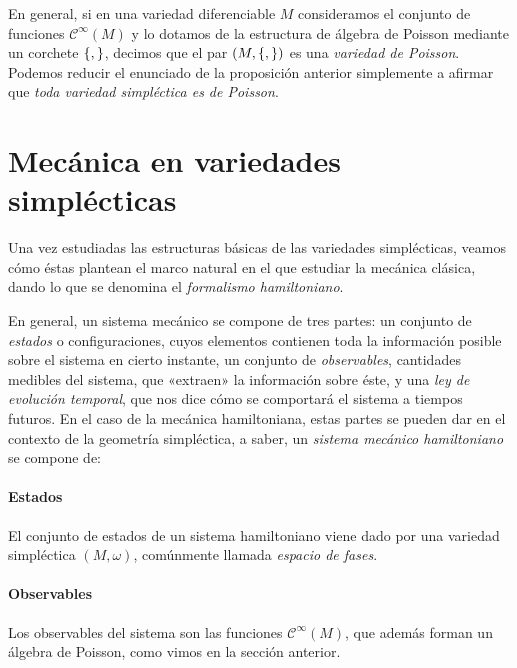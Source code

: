   En general, si en una variedad diferenciable $M$ consideramos el conjunto de funciones $\mathscr{C}^{\infty}(M)$ y lo dotamos de la estructura de álgebra de Poisson mediante un corchete $\left\lbrace , \right\rbrace$, decimos que el par $(M,\left\lbrace , \right\rbrace)$ es una \emph{variedad de Poisson}. Podemos reducir el enunciado de la proposición anterior simplemente a afirmar que \emph{toda variedad simpléctica es de Poisson}.

  \section{Mecánica en variedades simplécticas}
Una vez estudiadas las estructuras básicas de las variedades simplécticas, veamos cómo éstas plantean el marco natural en el que estudiar la mecánica clásica, dando lo que se denomina el \emph{formalismo hamiltoniano}. 

En general, un sistema mecánico se compone de tres partes: un conjunto de \emph{estados} o configuraciones, cuyos elementos contienen toda la información posible sobre el sistema en cierto instante, un conjunto de \emph{observables}, cantidades medibles del sistema, que «extraen» la información sobre éste, y una \emph{ley de evolución temporal}, que nos dice cómo se comportará el sistema a tiempos futuros. En el caso de la mecánica hamiltoniana, estas partes se pueden dar en el contexto de la geometría simpléctica, a saber, un \emph{sistema mecánico hamiltoniano} se compone de:

\paragraph{\textbf{Estados}} El conjunto de estados de un sistema hamiltoniano viene dado por una variedad simpléctica $(M,\omega)$, comúnmente llamada \emph{espacio de fases}.

\paragraph{\textbf{Observables}} Los observables del sistema son las funciones $\mathscr{C}^{\infty}(M)$, que además forman un álgebra de Poisson, como vimos en la sección anterior.

